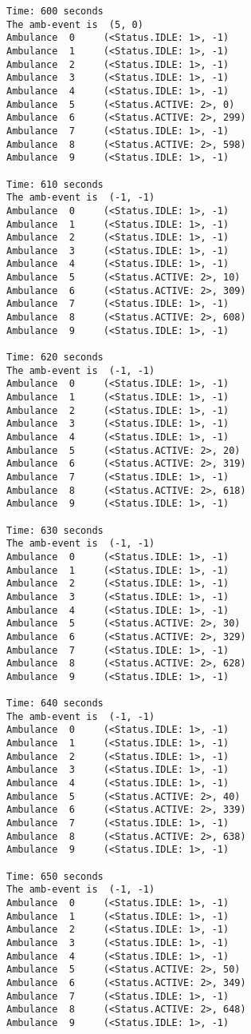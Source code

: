 \documentclass[11pt]{article}
\begin{document}
\begin{Verbatim}[commandchars=\\\{\}]
Time: 600 seconds
The amb-event is  (5, 0)
Ambulance  0	 (<Status.IDLE: 1>, -1)
Ambulance  1	 (<Status.IDLE: 1>, -1)
Ambulance  2	 (<Status.IDLE: 1>, -1)
Ambulance  3	 (<Status.IDLE: 1>, -1)
Ambulance  4	 (<Status.IDLE: 1>, -1)
Ambulance  5	 (<Status.ACTIVE: 2>, 0)
Ambulance  6	 (<Status.ACTIVE: 2>, 299)
Ambulance  7	 (<Status.IDLE: 1>, -1)
Ambulance  8	 (<Status.ACTIVE: 2>, 598)
Ambulance  9	 (<Status.IDLE: 1>, -1)

Time: 610 seconds
The amb-event is  (-1, -1)
Ambulance  0	 (<Status.IDLE: 1>, -1)
Ambulance  1	 (<Status.IDLE: 1>, -1)
Ambulance  2	 (<Status.IDLE: 1>, -1)
Ambulance  3	 (<Status.IDLE: 1>, -1)
Ambulance  4	 (<Status.IDLE: 1>, -1)
Ambulance  5	 (<Status.ACTIVE: 2>, 10)
Ambulance  6	 (<Status.ACTIVE: 2>, 309)
Ambulance  7	 (<Status.IDLE: 1>, -1)
Ambulance  8	 (<Status.ACTIVE: 2>, 608)
Ambulance  9	 (<Status.IDLE: 1>, -1)

Time: 620 seconds
The amb-event is  (-1, -1)
Ambulance  0	 (<Status.IDLE: 1>, -1)
Ambulance  1	 (<Status.IDLE: 1>, -1)
Ambulance  2	 (<Status.IDLE: 1>, -1)
Ambulance  3	 (<Status.IDLE: 1>, -1)
Ambulance  4	 (<Status.IDLE: 1>, -1)
Ambulance  5	 (<Status.ACTIVE: 2>, 20)
Ambulance  6	 (<Status.ACTIVE: 2>, 319)
Ambulance  7	 (<Status.IDLE: 1>, -1)
Ambulance  8	 (<Status.ACTIVE: 2>, 618)
Ambulance  9	 (<Status.IDLE: 1>, -1)

Time: 630 seconds
The amb-event is  (-1, -1)
Ambulance  0	 (<Status.IDLE: 1>, -1)
Ambulance  1	 (<Status.IDLE: 1>, -1)
Ambulance  2	 (<Status.IDLE: 1>, -1)
Ambulance  3	 (<Status.IDLE: 1>, -1)
Ambulance  4	 (<Status.IDLE: 1>, -1)
Ambulance  5	 (<Status.ACTIVE: 2>, 30)
Ambulance  6	 (<Status.ACTIVE: 2>, 329)
Ambulance  7	 (<Status.IDLE: 1>, -1)
Ambulance  8	 (<Status.ACTIVE: 2>, 628)
Ambulance  9	 (<Status.IDLE: 1>, -1)

Time: 640 seconds
The amb-event is  (-1, -1)
Ambulance  0	 (<Status.IDLE: 1>, -1)
Ambulance  1	 (<Status.IDLE: 1>, -1)
Ambulance  2	 (<Status.IDLE: 1>, -1)
Ambulance  3	 (<Status.IDLE: 1>, -1)
Ambulance  4	 (<Status.IDLE: 1>, -1)
Ambulance  5	 (<Status.ACTIVE: 2>, 40)
Ambulance  6	 (<Status.ACTIVE: 2>, 339)
Ambulance  7	 (<Status.IDLE: 1>, -1)
Ambulance  8	 (<Status.ACTIVE: 2>, 638)
Ambulance  9	 (<Status.IDLE: 1>, -1)

Time: 650 seconds
The amb-event is  (-1, -1)
Ambulance  0	 (<Status.IDLE: 1>, -1)
Ambulance  1	 (<Status.IDLE: 1>, -1)
Ambulance  2	 (<Status.IDLE: 1>, -1)
Ambulance  3	 (<Status.IDLE: 1>, -1)
Ambulance  4	 (<Status.IDLE: 1>, -1)
Ambulance  5	 (<Status.ACTIVE: 2>, 50)
Ambulance  6	 (<Status.ACTIVE: 2>, 349)
Ambulance  7	 (<Status.IDLE: 1>, -1)
Ambulance  8	 (<Status.ACTIVE: 2>, 648)
Ambulance  9	 (<Status.IDLE: 1>, -1)


\end{Verbatim}
\end{document}
